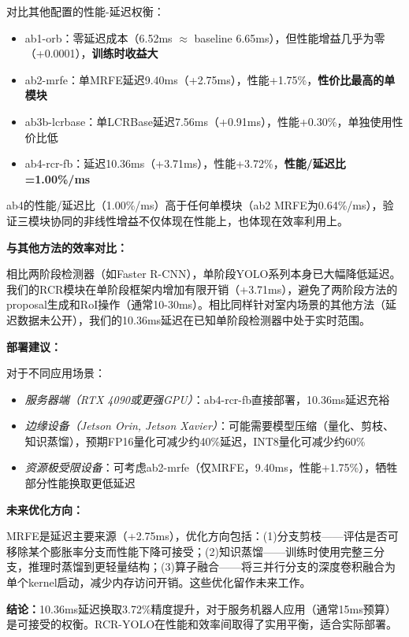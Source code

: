 \documentclass[journal]{IEEEtran}
\begin{document}
对比其他配置的性能-延迟权衡：

\begin{itemize}
    \item ab1-orb：零延迟成本（6.52ms $\approx$ baseline 6.65ms），但性能增益几乎为零（+0.0001），\textbf{训练时收益大}
    \item ab2-mrfe：单MRFE延迟9.40ms（+2.75ms），性能+1.75\%，\textbf{性价比最高的单模块}
    \item ab3b-lcrbase：单LCRBase延迟7.56ms（+0.91ms），性能+0.30\%，单独使用性价比低
    \item ab4-rcr-fb：延迟10.36ms（+3.71ms），性能+3.72\%，\textbf{性能/延迟比=1.00\%/ms}
\end{itemize}

ab4的性能/延迟比（1.00\%/ms）高于任何单模块（ab2 MRFE为0.64\%/ms），验证三模块协同的非线性增益不仅体现在性能上，也体现在效率利用上。

\textbf{与其他方法的效率对比：}

相比两阶段检测器（如Faster R-CNN），单阶段YOLO系列本身已大幅降低延迟。我们的RCR模块在单阶段框架内增加有限开销（+3.71ms），避免了两阶段方法的proposal生成和RoI操作（通常10-30ms）。相比同样针对室内场景的其他方法\cite{chen2020enhanced,zhang2021indoor}（延迟数据未公开），我们的10.36ms延迟在已知单阶段检测器中处于实时范围。

\textbf{部署建议：}

对于不同应用场景：

\begin{itemize}
    \item \textit{服务器端（RTX 4090或更强GPU）}：ab4-rcr-fb直接部署，10.36ms延迟充裕
    \item \textit{边缘设备（Jetson Orin, Jetson Xavier）}：可能需要模型压缩（量化、剪枝、知识蒸馏），预期FP16量化可减少约40\%延迟，INT8量化可减少约60\%
    \item \textit{资源极受限设备}：可考虑ab2-mrfe（仅MRFE，9.40ms，性能+1.75\%），牺牲部分性能换取更低延迟
\end{itemize}

\textbf{未来优化方向：}

MRFE是延迟主要来源（+2.75ms），优化方向包括：(1)分支剪枝——评估是否可移除某个膨胀率分支而性能下降可接受；(2)知识蒸馏——训练时使用完整三分支，推理时蒸馏到更轻量结构；(3)算子融合——将三并行分支的深度卷积融合为单个kernel启动，减少内存访问开销。这些优化留作未来工作。

\textbf{结论：}10.36ms延迟换取3.72\%精度提升，对于服务机器人应用（通常15ms预算）是可接受的权衡。RCR-YOLO在性能和效率间取得了实用平衡，适合实际部署。
\end{document}
